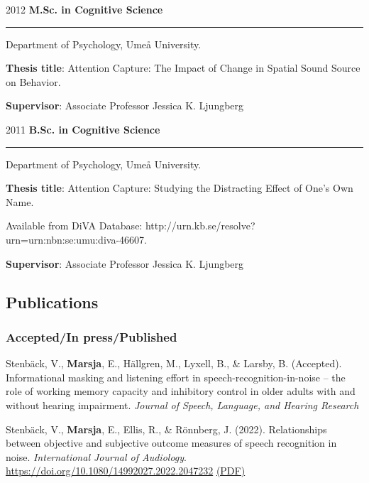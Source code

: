\documentclass[]{article}
\begin{document}
2012 \hspace{1.5cm}\textbf{M.Sc. in Cognitive Science}\vspace{1mm}

\hrule
\begin{changemargin}{2.3cm}{2.4cm}

Department of Psychology, Umeå University.

\textbf{Thesis title}: Attention Capture: The Impact of Change in Spatial Sound Source on Behavior. 
    
\textbf{Supervisor}: Associate Professor Jessica K. Ljungberg
\end{changemargin}

2011 \hspace{1.5cm}\textbf{B.Sc. in Cognitive Science}\vspace{1mm}

\hrule

\begin{changemargin}{2.3cm}{2.4cm}

Department of Psychology, Umeå University.

\textbf{Thesis title}:  Attention Capture: Studying the Distracting Effect of One’s Own Name.

Available from DiVA Database: \sloppy http://urn.kb.se/resolve?urn=urn:nbn:se:umu:diva-46607.
    
\textbf{Supervisor}: Associate Professor Jessica K. Ljungberg
\end{changemargin}

\hypertarget{publications}{%
\subsection{Publications}\label{publications}}

\hypertarget{acceptedin-presspublished}{%
\subsubsection{Accepted/In
press/Published}\label{acceptedin-presspublished}}

Stenbäck, V., \textbf{Marsja}, E., Hällgren, M., Lyxell, B., \& Larsby,
B. (Accepted). Informational masking and listening effort in
speech-recognition-in-noise -- the role of working memory capacity and
inhibitory control in older adults with and without hearing impairment.
\emph{Journal of Speech, Language, and Hearing Research}

Stenbäck, V., \textbf{Marsja}, E., Ellis, R., \& Rönnberg, J. (2022).
Relationships between objective and subjective outcome measures of
speech recognition in noise. \emph{International Journal of Audiology}.
\url{https://doi.org/10.1080/14992027.2022.2047232}
\href{https://bit.ly/IJA2022}{(PDF)}
\end{document}
